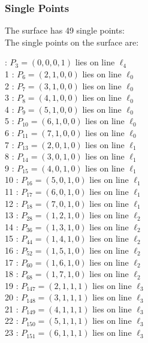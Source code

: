 \documentclass{article}
\begin{document}
{\subsubsection*{Single Points}
The surface has 49 single points:\\
The single points on the surface are:\\
\begin{multicols}{2}
 : $P_{3}=( 0, 0, 0, 1 )$ lies on line $\ell_{4}$\\
1 : $P_{6}=( 2, 1, 0, 0 )$ lies on line $\ell_{0}$\\
2 : $P_{7}=( 3, 1, 0, 0 )$ lies on line $\ell_{0}$\\
3 : $P_{8}=( 4, 1, 0, 0 )$ lies on line $\ell_{0}$\\
4 : $P_{9}=( 5, 1, 0, 0 )$ lies on line $\ell_{0}$\\
5 : $P_{10}=( 6, 1, 0, 0 )$ lies on line $\ell_{0}$\\
6 : $P_{11}=( 7, 1, 0, 0 )$ lies on line $\ell_{0}$\\
7 : $P_{13}=( 2, 0, 1, 0 )$ lies on line $\ell_{1}$\\
8 : $P_{14}=( 3, 0, 1, 0 )$ lies on line $\ell_{1}$\\
9 : $P_{15}=( 4, 0, 1, 0 )$ lies on line $\ell_{1}$\\
10 : $P_{16}=( 5, 0, 1, 0 )$ lies on line $\ell_{1}$\\
11 : $P_{17}=( 6, 0, 1, 0 )$ lies on line $\ell_{1}$\\
12 : $P_{18}=( 7, 0, 1, 0 )$ lies on line $\ell_{1}$\\
13 : $P_{28}=( 1, 2, 1, 0 )$ lies on line $\ell_{2}$\\
14 : $P_{36}=( 1, 3, 1, 0 )$ lies on line $\ell_{2}$\\
15 : $P_{44}=( 1, 4, 1, 0 )$ lies on line $\ell_{2}$\\
16 : $P_{52}=( 1, 5, 1, 0 )$ lies on line $\ell_{2}$\\
17 : $P_{60}=( 1, 6, 1, 0 )$ lies on line $\ell_{2}$\\
18 : $P_{68}=( 1, 7, 1, 0 )$ lies on line $\ell_{2}$\\
19 : $P_{147}=( 2, 1, 1, 1 )$ lies on line $\ell_{3}$\\
20 : $P_{148}=( 3, 1, 1, 1 )$ lies on line $\ell_{3}$\\
21 : $P_{149}=( 4, 1, 1, 1 )$ lies on line $\ell_{3}$\\
22 : $P_{150}=( 5, 1, 1, 1 )$ lies on line $\ell_{3}$\\
23 : $P_{151}=( 6, 1, 1, 1 )$ lies on line $\ell_{3}$\\

\end{multicols}}
\end{document}
